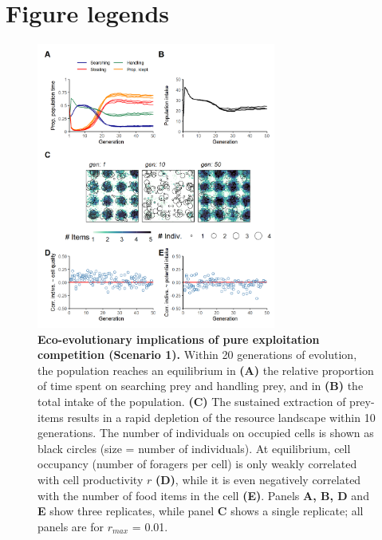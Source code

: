 \documentclass[11pt]{article}
\begin{document}
\newpage{}

\section{Figure legends}

\begin{figure}[h!]
    \centering
    \includegraphics[width=0.70\textwidth]{figures/fig_02.png}
    \caption{
        \textbf{Eco-evolutionary implications of pure exploitation competition (Scenario 1).}
        Within 20 generations of evolution, the population reaches an equilibrium in \textbf{(A)} the relative proportion of time spent on searching prey and handling prey, and in \textbf{(B)} the total intake of the population.
        \textbf{(C)} The sustained extraction of prey-items results in a rapid depletion of the resource landscape within 10 generations. The number of individuals on occupied cells is shown as black circles (size = number of individuals).
        At equilibrium, cell occupancy (number of foragers per cell) is only weakly correlated with cell productivity $r$ \textbf{(D)}, while it is even negatively correlated with the number of food items in the cell \textbf{(E)}.
        Panels \textbf{A, B, D} and \textbf{E} show three replicates, while panel \textbf{C} shows a single replicate; all panels are for $r_{max}$ = 0.01.
    }
    \label{Fig:Model1}
\end{figure}
\end{document}
